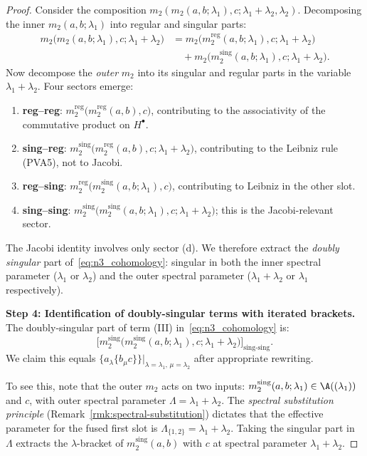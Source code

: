 \begin{proof}
Consider the composition $m_2(m_2(a,b;\lambda_1),c;\lambda_1{+}\lambda_2,\lambda_2)$. Decomposing the inner $m_2(a,b;\lambda_1)$ into regular and singular parts:
\begin{align*}
m_2\bigl(m_2(a,b;\lambda_1),c;\lambda_1{+}\lambda_2\bigr)
&= m_2\bigl(m_2^{\mathrm{reg}}(a,b;\lambda_1),c;\lambda_1{+}\lambda_2\bigr) \\
&\quad + m_2\bigl(m_2^{\mathrm{sing}}(a,b;\lambda_1),c;\lambda_1{+}\lambda_2\bigr).
\end{align*}
Now decompose the \emph{outer} $m_2$ into its singular and regular parts in the variable $\lambda_1+\lambda_2$. Four sectors emerge:
\begin{enumerate}[label=(\alph*)]
\item \textbf{reg--reg}: $m_2^{\mathrm{reg}}\bigl(m_2^{\mathrm{reg}}(a,b),c\bigr)$, contributing to the associativity of the commutative product on $H^\bullet$.
\item \textbf{sing--reg}: $m_2^{\mathrm{sing}}\bigl(m_2^{\mathrm{reg}}(a,b),c;\lambda_1{+}\lambda_2\bigr)$, contributing to the Leibniz rule (PVA5), not to Jacobi.
\item \textbf{reg--sing}: $m_2^{\mathrm{reg}}\bigl(m_2^{\mathrm{sing}}(a,b;\lambda_1),c\bigr)$, contributing to Leibniz in the other slot.
\item \textbf{sing--sing}: $m_2^{\mathrm{sing}}\bigl(m_2^{\mathrm{sing}}(a,b;\lambda_1),c;\lambda_1{+}\lambda_2\bigr)$; this is the Jacobi-relevant sector.
\end{enumerate}
The Jacobi identity involves only sector (d). We therefore extract the \emph{doubly singular} part of~\eqref{eq:n3_cohomology}: singular in both the inner spectral parameter ($\lambda_1$ or $\lambda_2$) and the outer spectral parameter ($\lambda_1+\lambda_2$ or $\lambda_1$ respectively).

\medskip
\textbf{Step 4: Identification of doubly-singular terms with iterated brackets.}
The doubly-singular part of term (III) in~\eqref{eq:n3_cohomology} is:
\begin{equation}
\bigl[m_2^{\mathrm{sing}}\bigl(m_2^{\mathrm{sing}}(a,b;\lambda_1),c;\lambda_1{+}\lambda_2\bigr)\bigr]_{\mathrm{sing\text{-}sing}}.
\end{equation}
We claim this equals $\{a_\lambda \{b_\mu c\}\}\big|_{\lambda=\lambda_1,\,\mu=\lambda_2}$ after appropriate rewriting.

To see this, note that the outer $m_2$ acts on two inputs: $m_2^{\mathrm{sing}}(a,b;\lambda_1) \in \A((\lambda_1))$ and $c$, with outer spectral parameter $\Lambda = \lambda_1 + \lambda_2$. The \emph{spectral substitution principle} (Remark~\ref{rmk:spectral-substitution}) dictates that the effective parameter for the fused first slot is $\Lambda_{\{1,2\}} = \lambda_1 + \lambda_2$. Taking the singular part in $\Lambda$ extracts the $\lambda$-bracket of $m_2^{\mathrm{sing}}(a,b)$ with $c$ at spectral parameter $\lambda_1+\lambda_2$.


\end{proof}
